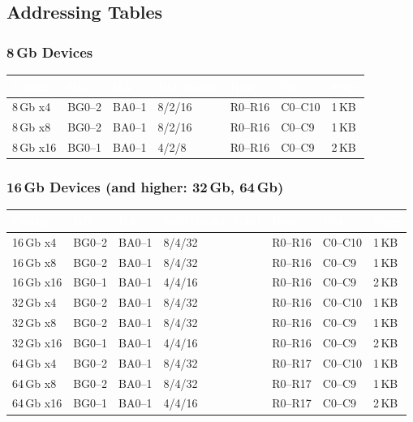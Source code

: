 \documentclass[10pt,a4paper,twoside]{article}
\newcommand{\thd}[1]{\cellcolor{navyblue}\textcolor{white}{\textbf{#1}}}
\newcommand{\trow}{\rowcolor{lightgray}}
\newcommand{\talt}{\rowcolor{skyblue!30}}
\begin{document}
\subsection{Addressing Tables}

\subsubsection{8\,Gb Devices}
\begin{center}
\begin{tabularx}{\linewidth}{@{} l l l l l l l @{}}
\toprule
\thd{Config} & \thd{BG} & \thd{BA} & \thd{BG/Banks} & \thd{Row} & \thd{Col} & \thd{Page} \\
\midrule
\trow 8\,Gb x4 & BG0--2 & BA0--1 & 8/2/16 & R0--R16 & C0--C10 & 1\,KB \\
\talt 8\,Gb x8 & BG0--2 & BA0--1 & 8/2/16 & R0--R16 & C0--C9  & 1\,KB \\
\trow 8\,Gb x16 & BG0--1 & BA0--1 & 4/2/8  & R0--R16 & C0--C9  & 2\,KB \\
\bottomrule
\end{tabularx}
\end{center}

\subsubsection{16\,Gb Devices (and higher: 32\,Gb, 64\,Gb)}
\begin{center}
\begin{tabularx}{\linewidth}{@{} l l l l l l l @{}}
\toprule
\thd{Config} & \thd{BG} & \thd{BA} & \thd{BG/Banks/Total} & \thd{Row} & \thd{Col} & \thd{Page} \\
\midrule
\trow 16\,Gb x4 & BG0--2 & BA0--1 & 8/4/32 & R0--R16 & C0--C10 & 1\,KB \\
\talt 16\,Gb x8 & BG0--2 & BA0--1 & 8/4/32 & R0--R16 & C0--C9  & 1\,KB \\
\trow 16\,Gb x16 & BG0--1 & BA0--1 & 4/4/16 & R0--R16 & C0--C9 & 2\,KB \\
\midrule
\trow 32\,Gb x4 & BG0--2 & BA0--1 & 8/4/32 & R0--R16 & C0--C10 & 1\,KB \\
\talt 32\,Gb x8 & BG0--2 & BA0--1 & 8/4/32 & R0--R16 & C0--C9  & 1\,KB \\
\trow 32\,Gb x16 & BG0--1 & BA0--1 & 4/4/16 & R0--R16 & C0--C9 & 2\,KB \\
\midrule
\trow 64\,Gb x4 & BG0--2 & BA0--1 & 8/4/32 & R0--R17 & C0--C10 & 1\,KB \\
\talt 64\,Gb x8 & BG0--2 & BA0--1 & 8/4/32 & R0--R17 & C0--C9  & 1\,KB \\
\trow 64\,Gb x16 & BG0--1 & BA0--1 & 4/4/16 & R0--R17 & C0--C9 & 2\,KB \\
\bottomrule
\end{tabularx}
\end{center}
\end{document}
